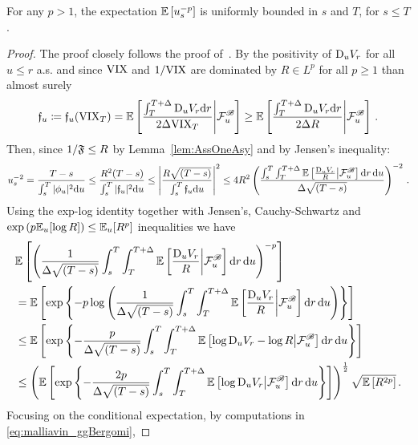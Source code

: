 \begin{lemma}\label{lem:AssThreeAsy}
    For any $p>1$, the expectation $\mathbb{E}\left[u_s^{-p}\right]$ is uniformly bounded in $s$ and $T$, for $s \leq T$.
\end{lemma}
\begin{proof}
    The proof closely follows the proof of~\cite[Lemma~6.15]{Jacquier2021RoughOptions}. By the positivity of $\mathrm{D}_u V_r$ for all $u\leq r$ a.s. and since $\mathrm{VIX}$ and $1/\mathrm{VIX}$ are dominated by $R\in L^p$ for all $p\geq 1$ than almost surely
    \begin{equation*}
        \mathfrak{f}_u \coloneqq \mathfrak{f}_u(\mathrm{VIX}_T) = \mathbb{E}\left[ \frac{\int_T^{T+\Delta}\mathrm{D}_u V_r \mathrm{d} r}{2 \Delta \mathrm{VIX}_T}\middle\vert \mathcal{F}^{\mathscr{B}}_u\right] \geq \mathbb{E}\left[\frac{\int_T^{T+\Delta}\mathrm{D}_u V_r \mathrm{d} r}{2 \Delta R}\middle\vert \mathcal{F}^{\mathscr{B}}_u\right]\,.
    \end{equation*}
    Then, since $1/\mathfrak{F} \leq R$ by Lemma~\ref{lem:AssOneAsy} and by Jensen's inequality:
    \begin{align*}
        u_s^{-2} = \frac{T-s}{\int_s^T|\phi_u|^2 \mathrm{d} u} \leq \frac{R^2 (T-s)}{\int_s^T |\mathfrak{f}_u|^2 \mathrm{d} u} \leq \left| \frac{R \sqrt{(T-s)}}{\int_s^T \mathfrak{f}_u \mathrm{d} u} \right|^2 \leq 4R^2 \left( \frac{\int_s^T \int_T^{T+\Delta} \mathbb{E}\left[\frac{\mathrm{D}_u V_r}{R}\middle\vert \mathcal{F}^{\mathscr{B}}_u\right] \mathrm{d} r\, \mathrm{d} u}{\Delta\sqrt{(T-s)}}\right)^{-2}\,.
    \end{align*}
    Using the exp-log identity together with Jensen's, Cauchy-Schwartz and $\exp\left(p\mathbb{E}_u[\log R]\right) \leq \mathbb{E}_u[R^p]$ inequalities we have
    \begin{align*}
        &\mathbb{E}\left[\left(\frac{1}{\Delta\sqrt{(T-s)}} \int_s^T \int_T^{T+\Delta} \mathbb{E}\left[\frac{\mathrm{D}_u V_r}{R}\middle\vert\mathcal{F}^{\mathscr{B}}_u\right] \mathrm{d} r\, \mathrm{d} u\right)^{-p}\right] \\ 
        &= \mathbb{E}\left[\exp\left\{-p\log\left(\frac{1}{\Delta\sqrt{(T-s)}} \int_s^T \int_T^{T+\Delta} \mathbb{E}\left[\frac{\mathrm{D}_u V_r}{R}\middle\vert\mathcal{F}^{\mathscr{B}}_u\right] \mathrm{d} r\, \mathrm{d} u\right)\right\}\right] \\
        &\leq \mathbb{E}\left[\exp\left\{-\frac{p}{\Delta\sqrt{(T-s)}}\int_s^T \int_T^{T+\Delta} \mathbb{E}\left[\log\mathrm{D}_u V_r - \log R\middle\vert\mathcal{F}^{\mathscr{B}}_u\right] \mathrm{d} r\, \mathrm{d} u\right\}\right] \\
        &\leq \left(\mathbb{E}\left[\exp\left\{-\frac{2p}{\Delta\sqrt{(T-s)}}\int_s^T \int_T^{T+\Delta} \mathbb{E}\left[\log\mathrm{D}_u V_r\middle\vert\mathcal{F}^{\mathscr{B}}_u\right] \mathrm{d} r\, \mathrm{d} u\right\}\right]\right)^{\frac12} \sqrt{\mathbb{E}\left[R^{2p}\right]}\,.
    \end{align*}
Focusing on the conditional expectation, by computations in \eqref{eq:malliavin_ggBergomi},

\end{proof}

